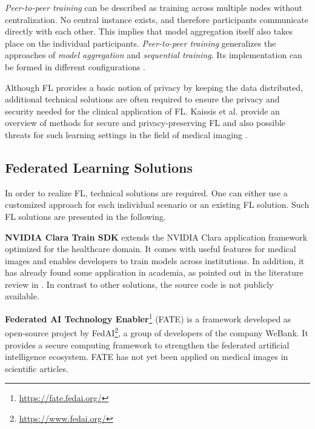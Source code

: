 \textit{Peer-to-peer training} can be described as training across multiple nodes without centralization. No central instance exists, and therefore participants communicate directly with each other. This implies that model aggregation itself also takes place on the individual participants.
\textit{Peer-to-peer training} generalizes the approaches of \textit{model aggregation} and \textit{sequential training}. Its implementation can be formed in different configurations .%

Although FL provides a basic notion of privacy by keeping the data distributed, additional technical solutions are often required to ensure the privacy and security needed for the clinical application of FL. Kaissis et al. provide an overview of methods for secure and privacy-preserving FL and also possible threats for such learning settings in the field of medical imaging \citep{Kaissis2020SecureImaging}.



\subsection{Federated Learning Solutions}
\label{subsec:SolutionsFL}

In order to realize FL, technical solutions are required. One can either use a customized approach for each individual scenario or an existing FL solution. Such FL solutions are presented in the following. %

\textbf{NVIDIA Clara Train SDK}
extends the NVIDIA Clara application framework optimized for the healthcare domain. It comes with useful features for medical images and enables developers to train models across institutions. In addition, it has already found some application in academia, as pointed out in the literature review in . In contrast to other solutions, the source code is not publicly available.

\textbf{Federated AI Technology Enabler}\footnote{\url{https://fate.fedai.org/}}
(FATE) is a framework developed as open-source project by FedAI\footnote{\url{https://www.fedai.org/}}, a group of developers of the company WeBank. It provides a secure computing framework to strengthen the federated artificial intelligence ecosystem.
FATE has not yet been applied on medical images in scientific articles.

